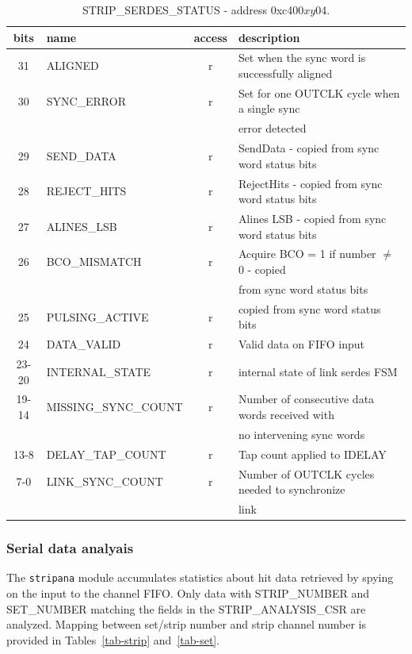 \documentclass[11pt]{article}
\begin{document}
\begin{table}
\begin{center}
\small
\begin{tabular}{|c|l|c|l|} \hline
bits & name & access & description \\ \hline\hline
31 & ALIGNED & r & Set when the sync word is successfully aligned \\ \hline
30 & SYNC\_ERROR & r & Set for one OUTCLK cycle when a single sync \\
   &             &   & error detected \\ \hline
29 & SEND\_DATA  & r & SendData - copied from sync word status bits \\ \hline
28 & REJECT\_HITS & r & RejectHits - copied from sync word status bits \\ \hline
27 & ALINES\_LSB & r & Alines LSB - copied from sync word status bits \\ \hline
26 & BCO\_MISMATCH & r & Acquire BCO = 1 if number $\ne$ 0 - copied \\
   &               &   & from sync word status bits \\ \hline
25 & PULSING\_ACTIVE & r & copied from sync word status bits \\ \hline
24 & DATA\_VALID & r & Valid data on FIFO input \\
23-20 & INTERNAL\_STATE & r & internal state of link serdes FSM \\ \hline
19-14 & MISSING\_SYNC\_COUNT & r & Number of consecutive data words received with \\
      &                      &   & no intervening sync words \\ \hline
13-8 & DELAY\_TAP\_COUNT & r & Tap count applied to IDELAY \\ \hline
7-0  & LINK\_SYNC\_COUNT & r & Number of OUTCLK cycles needed to synchronize \\
     &                   &   & link \\ \hline
\end{tabular}
\end{center}
\caption{\label{tab-serdesstatus}STRIP\_SERDES\_STATUS - address 0xc400$xy$04.}
\end{table}

\clearpage
\subsubsection{Serial data analyais}
The {\tt stripana} module accumulates statistics about hit data retrieved
by spying on the input to the channel FIFO.  Only data with
STRIP\_NUMBER and SET\_NUMBER matching the fields in the
STRIP\_ANALYSIS\_CSR are analyzed.  Mapping between set/strip number
and strip channel number is provided in Tables~\ref{tab-strip}
and~\ref{tab-set}.
\end{document}
